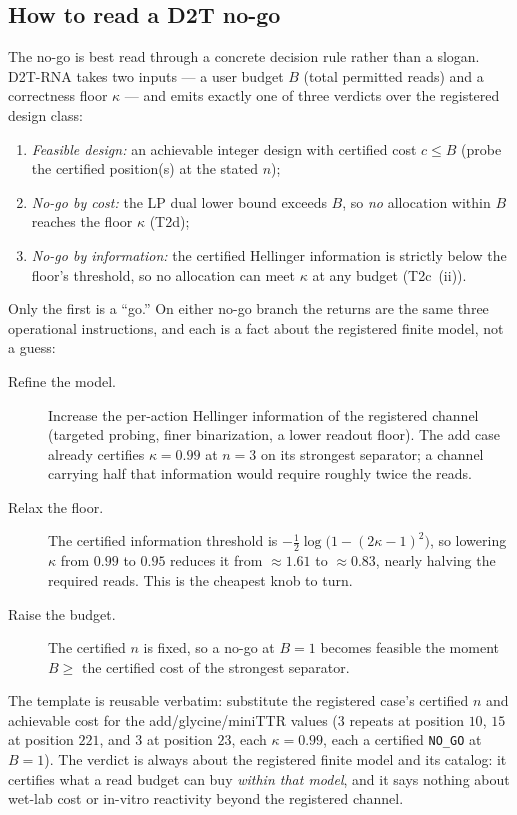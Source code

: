 \documentclass[11pt]{article}
\begin{document}
\subsection{How to read a \textsc{D2T} no-go}\label{sec:read-nogo}
The no-go is best read through a concrete decision rule rather than a slogan. \textsc{D2T}-RNA takes two
inputs --- a user budget $B$ (total permitted reads) and a correctness floor $\kappa$ --- and emits
exactly one of three verdicts over the registered design class:
\begin{enumerate}
  \item \emph{Feasible design:} an achievable integer design with certified cost $c\le B$ (probe the
        certified position(s) at the stated $n$);
  \item \emph{No-go by cost:} the LP dual lower bound exceeds $B$, so \emph{no} allocation within $B$
        reaches the floor $\kappa$ (T2d);
  \item \emph{No-go by information:} the certified Hellinger information is strictly below the floor's
        threshold, so no allocation can meet $\kappa$ at any budget (T2c~(ii)).
\end{enumerate}
Only the first is a ``go.'' On either no-go branch the returns are the same three operational
instructions, and each is a fact about the registered finite model, not a guess:
\begin{description}
  \item[Refine the model.] Increase the per-action Hellinger information of the registered channel
        (targeted probing, finer binarization, a lower readout floor). The add case already certifies
        $\kappa=0.99$ at $n=3$ on its strongest separator; a channel carrying half that information
        would require roughly twice the reads.
  \item[Relax the floor.] The certified information threshold is
        $-\tfrac12\log\!\bigl(1-(2\kappa-1)^2\bigr)$, so lowering $\kappa$ from $0.99$ to $0.95$
        reduces it from $\approx1.61$ to $\approx0.83$, nearly halving the required reads. This is the
        cheapest knob to turn.
  \item[Raise the budget.] The certified $n$ is fixed, so a no-go at $B=1$ becomes feasible the moment
        $B\ge$ the certified cost of the strongest separator.
\end{description}
The template is reusable verbatim: substitute the registered case's certified $n$ and achievable cost
for the add/glycine/miniTTR values ($3$ repeats at position $10$, $15$ at position $221$, and $3$ at
position $23$, each $\kappa=0.99$, each a certified \texttt{NO\_GO} at $B=1$). The verdict is always
about the registered finite model and its catalog: it certifies what a read budget can buy \emph{within
that model}, and it says nothing about wet-lab cost or in-vitro reactivity beyond the registered
channel.
\end{document}
